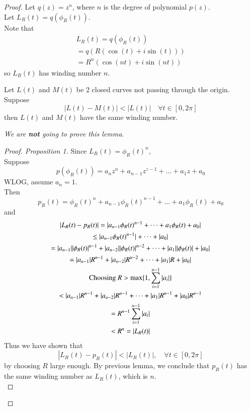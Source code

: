 \documentclass[10pt]{article}
\begin{document}
		\begin{proof}
			Let $q(z) = z^n$, where $n$ is the degree of polynomial $p(z)$. \\
			Let $L_R(t) = q(\phi_R(t))$. \\
			Note that
			\begin{gather*}
				L_R(t) = q(\phi_R(t)) \\
				= q(R(\cos(t) + i\sin(t))) \\
				= R^n (\cos(nt) + i\sin(nt))
			\end{gather*}
			so $L_R(t)$ has winding number $n$. \\
			\begin{lemma}
				Let $L(t)$ and $M(t)$ be 2 closed curves not passing through the origin. \\
				Suppose 
				\[
					| L(t) - M(t) | < | L(t) |\quad \forall t \in [0, 2\pi]
				\]
				then $L(t)$ and $M(t)$ have the same winding number.
			\end{lemma}
			\emph{We are \textbf{not} going to prove this lemma}. \\
			\begin{proof}[Proof. Proposition 1]
				Since $L_R(t) = \phi_R(t)^n$, \\
				Suppose 
				\[
					p(\phi_R(t)) = a_n z^n + a_{n-1} z^{z-1} + \dots + a_1 z + a_0
				\]
				WLOG, assume $a_n=1$. \\
				Then 
				\[
					p_R(t) = \phi_R(t)^n + a_{n-1} \phi_R(t)^{n-1} + \dots + a_1 \phi_R(t) + a_0
				\]
				and 
				\begin{gather*}
					|L_R(t) - p_R(t)| = |a_{n-1} \phi_R(t)^{n-1} + \dots + a_1 \phi_R(t) + a_0| \\
					\leq |a_{n-1}\phi_R(t)^{n-1}| + \dots + |a_0| \\
					= |a_{n-1}| |\phi_R(t)|^{n-1} + |a_{n-2}| |\phi_R(t)|^{n-2} + \dots + |a_1| |\phi_R(t)| + |a_0| \\
					= |a_{n-1}| R^{n-1} + |a_{n-2}| R^{n-2} + \dots + |a_1| R + |a_0| \\
					\text{{Choosing }} R > \max \{1, \sum_{i=1}^{n-1}|a_i|\} \\
					< |a_{n-1}| R^{n-1} + |a_{n-2}| R^{n-1} + \dots + |a_1| R^{n-1} + |a_0| R^{n-1} \\
					= R^{n-1} \sum_{i=1}^{n-1} |a_i| \\
					< R^n = |L_R(t)|
				\end{gather*}
				Thus we have shown that
				\[
					|L_R(t) - p_R(t)| < |L_R(t)|,\quad \forall t \in [0, 2\pi]
				\]
				by choosing $R$ large enough. By previous lemma, we conclude that $p_R(t)$ has the same winding number as $L_R(t)$, which is $n$. \\

\end{proof}
\end{proof}
\end{document}
